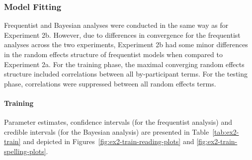\documentclass[doc,floatsintext]{apa6}
\let\oldparagraph\paragraph
\renewcommand{\paragraph}[1]{\oldparagraph{#1}\mbox{}}
\begin{document}
\subsubsection{Model Fitting}\label{model-fitting-2}

Frequentist and Bayesian analyses were conducted in the same way as for
Experiment 2b. However, due to differences in convergence for the
frequentist analyses across the two experiments, Experiment 2b had some
minor differences in the random effects structure of frequentist models
when compared to Experiment 2a. For the training phase, the maximal
converging random effects structure included correlations between all
by-participant terms. For the testing phase, correlations were
suppressed between all random effects terms.

\paragraph{Training}\label{training-2}

Parameter estimates, confidence intervals (for the frequentist analysis)
and credible intervals (for the Bayesian analysis) are presented in
Table~\ref{tab:ex2-train} and depicted in
Figures~\ref{fig:ex2-train-reading-plots} and
\ref{fig:ex2-train-spelling-plots}.
\end{document}
